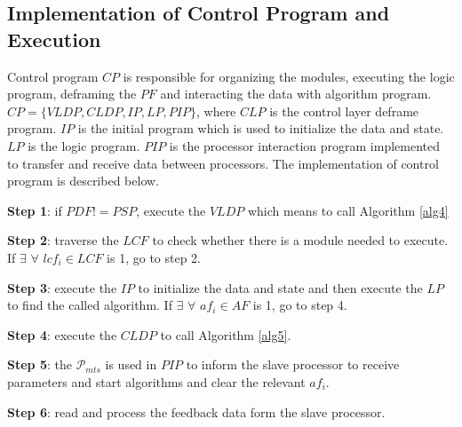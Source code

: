 \documentclass[journal,UTF8]{IEEEtran}
\begin{document}


\subsection{Implementation of Control Program and Execution}
Control program $CP$ is responsible for organizing the modules, executing the logic program, deframing the $PF$ and interacting the data with algorithm program. $CP=\{VLDP,CLDP, IP, LP, PIP\}$, where $CLP$ is the control layer deframe program. $IP$ is the initial program which is used to initialize the data and state. $LP$ is the logic program. $PIP$ is the processor interaction program implemented to transfer and receive data between processors. The implementation of control program is described below.

\textbf{Step 1}: if $PDF!=PSP$, execute the $VLDP$ which means to call Algorithm \ref{alg4}

\textbf{Step 2}: traverse the $LCF$ to check whether there is a module needed to execute. If $\exists$ $\forall$ $lcf_i \in LCF$ is 1, go to step 2.

\textbf{Step 3}: execute the $IP$ to initialize the data and state and then execute the $LP$ to find the called algorithm. If $\exists$ $\forall$ $af_i \in AF$ is 1, go to step 4. 

\textbf{Step 4}: execute the $CLDP$ to call Algorithm \ref{alg5}. 

\textbf{Step 5}: the $\mathcal{P}_{mts}$ is used in $PIP$ to inform the slave processor to receive parameters and start algorithms and clear the relevant $af_i$.   

\textbf{Step 6}: read and process the feedback data form the slave processor. 






\end{document}
